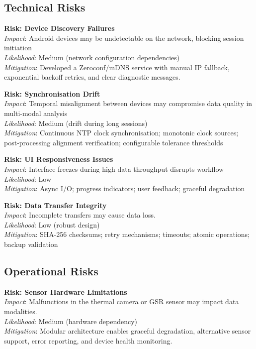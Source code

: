 \subsection{Technical Risks}
\textbf{Risk: Device Discovery Failures}\\
\emph{Impact}: Android devices may be undetectable on the network, blocking session initiation\\
\emph{Likelihood}: Medium (network configuration dependencies)\\
\emph{Mitigation}: Developed a Zeroconf/mDNS service with manual IP fallback, exponential backoff retries, and clear diagnostic messages.

\textbf{Risk: Synchronisation Drift}\\
\emph{Impact}: Temporal misalignment between devices may compromise data quality in multi-modal analysis\\
\emph{Likelihood}: Medium (drift during long sessions)\\
\emph{Mitigation}: Continuous NTP clock synchronisation; monotonic clock sources; post-processing alignment verification; configurable tolerance thresholds

\textbf{Risk: UI Responsiveness Issues}\\
\emph{Impact}: Interface freezes during high data throughput disrupts workflow\\
\emph{Likelihood}: Low\\
\emph{Mitigation}: Async I/O; progress indicators; user feedback; graceful degradation

\textbf{Risk: Data Transfer Integrity}\\
\emph{Impact}: Incomplete transfers may cause data loss.\\
\emph{Likelihood}: Low (robust design)\\
\emph{Mitigation}: SHA-256 checksums; retry mechanisms; timeouts; atomic operations; backup validation

\subsection{Operational Risks}
\textbf{Risk: Sensor Hardware Limitations}\\
\emph{Impact}: Malfunctions in the thermal camera or GSR sensor may impact data modalities.\\
\emph{Likelihood}: Medium (hardware dependency)\\
\emph{Mitigation}: Modular architecture enables graceful degradation, alternative sensor support, error reporting, and device health monitoring.

